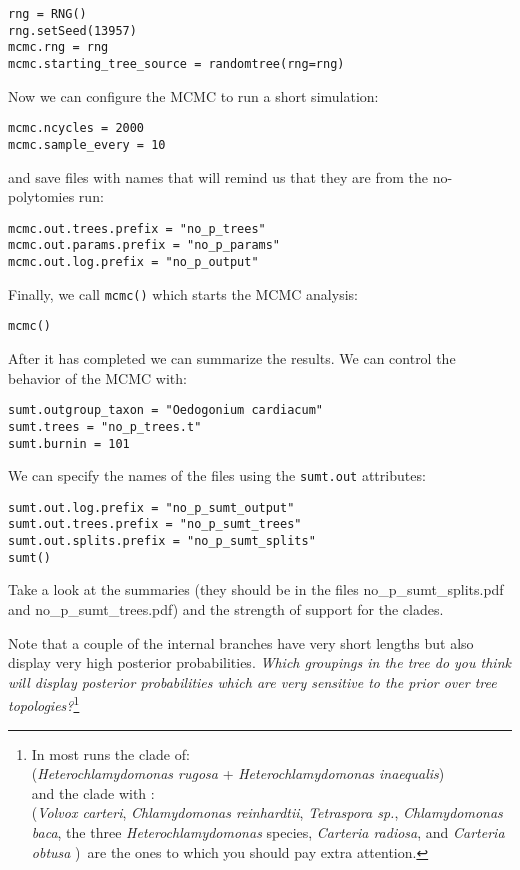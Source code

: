 \documentclass{article}
\newcommand{\cmd}[1]{\texttt{#1}\xspace}
\newcommand{\localfile}[1]{\textsf{#1}\xspace}
\newcommand{\QandA}[2]{\textit{#1}\footnote{#2}\xspace}
\begin{document}
\begin{verbatim}
rng = RNG()
rng.setSeed(13957)
mcmc.rng = rng
mcmc.starting_tree_source = randomtree(rng=rng)
\end{verbatim}

Now we can configure the MCMC to run a short simulation:
\begin{verbatim}
mcmc.ncycles = 2000
mcmc.sample_every = 10
\end{verbatim}
 and save files with names that will remind us that they are from the no-polytomies run:
\begin{verbatim}
mcmc.out.trees.prefix = "no_p_trees"
mcmc.out.params.prefix = "no_p_params"
mcmc.out.log.prefix = "no_p_output"
\end{verbatim}

Finally, we call \cmd{mcmc()} which starts the MCMC analysis:
\begin{verbatim}
mcmc()
\end{verbatim}

After it has completed we can summarize the results.
We can control the behavior of the MCMC with:
\begin{verbatim}
sumt.outgroup_taxon = "Oedogonium cardiacum"
sumt.trees = "no_p_trees.t"
sumt.burnin = 101
\end{verbatim}

We can specify the names of the files using the \cmd{sumt.out} attributes:
\begin{verbatim}
sumt.out.log.prefix = "no_p_sumt_output"
sumt.out.trees.prefix = "no_p_sumt_trees"
sumt.out.splits.prefix = "no_p_sumt_splits"
sumt()
\end{verbatim}
Take a look at the summaries (they should be in the files \localfile{no\_p\_sumt\_splits.pdf} and \localfile{no\_p\_sumt\_trees.pdf}) and  the strength of support for the clades.

Note that a couple of the internal branches have very short lengths but 
also display very high posterior probabilities.  
\QandA{Which groupings in the tree do you think will display posterior probabilities
which are very sensitive to the prior over tree topologies?}{In most runs the clade of:\\ ({\em Heterochlamydomonas rugosa} + {\em Heterochlamydomonas inaequalis})\\ 
and the clade with :\\ 
({\em Volvox carteri},
{\em Chlamydomonas reinhardtii},
{\em Tetraspora sp.},
{\em Chlamydomonas baca},
the three {\em Heterochlamydomonas} species,
{\em Carteria radiosa}, and {\em Carteria obtusa }
)\
are the ones to which you should pay extra attention.}
\end{document}
